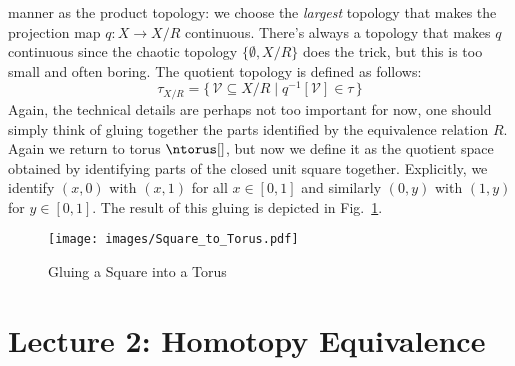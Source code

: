 \documentclass[oneside]{book}                                                  %
\begin{document}
                manner as the product topology: we choose the \textit{largest}
                topology that makes the projection map $q:X\rightarrow{X}/R$
                continuous. There's always a topology that makes $q$ continuous
                since the chaotic topology $\{\emptyset,X/R\}$ does the trick,
                but this is too small and often boring. The quotient topology is
                defined as follows:
                \begin{equation}
                    \tau_{X/R}=\{\,\mathcal{V}\subseteq{X}/R\;|\;
                        q^{\minus{1}}[\mathcal{V}]\in\tau\,\}
                \end{equation}
                Again, the technical details are perhaps not too important for
                now, one should simply think of gluing together the parts
                identified by the equivalence relation $R$. Again we return to
                torus $\ntorus[]$, but now we define it as the quotient space
                obtained by identifying parts of the closed unit square
                together. Explicitly, we identify $(x,0)$ with $(x,1)$ for all
                $x\in[0,1]$ and similarly $(0,y)$ with $(1,y)$ for $y\in[0,1]$.
                The result of this gluing is depicted in
                Fig.~\ref{fig:Square_to_Torus}.
                \begin{figure}[H]
                    \centering
                    \captionsetup{type=figure}
                    \texttt{[image: images/Square\_to\_Torus.pdf]}
                    \caption{Gluing a Square into a Torus}
                    \label{fig:Square_to_Torus}
                \end{figure}
        \section{Lecture 2: Homotopy Equivalence}
\end{document}
